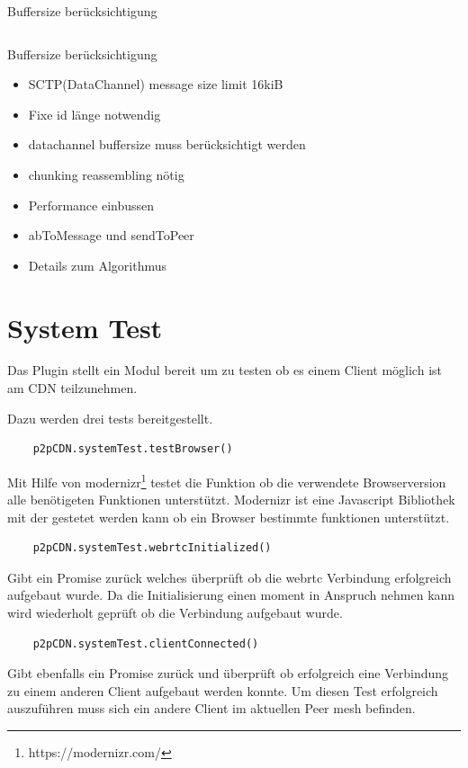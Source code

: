 \begin{listing}[h]
	\inputminted{javascript}{listings/buffersize.js}
	\caption{Buffersize berücksichtigung}
	\label{lst:code-buffersize}
\end{listing}
\begin{listing}[h]
	\inputminted{javascript}{listings/handle_chunk.js}
	\caption{Buffersize berücksichtigung}
	\label{lst:code-handle-chunk}
\end{listing}

\begin{itemize}
  \item SCTP(DataChannel) message size limit 16kiB
  \item Fixe id länge notwendig
  \item datachannel buffersize muss berücksichtigt werden
  \item chunking reassembling nötig
  \item Performance einbussen
  \item abToMessage und sendToPeer
\end{itemize}



\begin{itemize}
	\item Details zum Algorithmus
\end{itemize}
\section{System Test}
Das Plugin stellt ein Modul bereit um zu testen ob es einem Client möglich ist am \pTp CDN teilzunehmen.

Dazu werden drei tests bereitgestellt.
\begin{lstlisting}
	p2pCDN.systemTest.testBrowser()
\end{lstlisting}
 Mit Hilfe von modernizr\footnote{https://modernizr.com/} testet die Funktion ob die verwendete Browserversion alle benötigeten Funktionen unterstützt. Modernizr ist eine Javascript Bibliothek mit der gestetet werden kann ob ein Browser bestimmte funktionen unterstützt.
\begin{lstlisting}
	p2pCDN.systemTest.webrtcInitialized()
\end{lstlisting}
Gibt ein Promise zurück welches überprüft ob die webrtc Verbindung erfolgreich aufgebaut wurde. Da die Initialisierung einen moment in Anspruch nehmen kann wird wiederholt geprüft ob die Verbindung aufgebaut wurde.
\begin{lstlisting}
	p2pCDN.systemTest.clientConnected()
\end{lstlisting}
Gibt ebenfalls ein Promise zurück und überprüft ob erfolgreich eine Verbindung zu einem anderen Client aufgebaut werden konnte. Um diesen Test erfolgreich auszuführen muss sich ein andere Client im aktuellen Peer mesh befinden.

